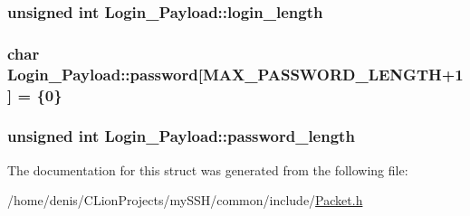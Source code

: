 \subsubsection[{\texorpdfstring{login\+\_\+length}{login_length}}]{\setlength{\rightskip}{0pt plus 5cm}unsigned int Login\+\_\+\+Payload\+::login\+\_\+length}\hypertarget{structLogin__Payload_ae20d686a1176b58a1409a551dbbe539b}{}\label{structLogin__Payload_ae20d686a1176b58a1409a551dbbe539b}
\subsubsection[{\texorpdfstring{password}{password}}]{\setlength{\rightskip}{0pt plus 5cm}char Login\+\_\+\+Payload\+::password\mbox{[}{\bf M\+A\+X\+\_\+\+P\+A\+S\+S\+W\+O\+R\+D\+\_\+\+L\+E\+N\+G\+TH}+1\mbox{]} = \{0\}}\hypertarget{structLogin__Payload_aadc289041604b574892f1cdb966c7ca5}{}\label{structLogin__Payload_aadc289041604b574892f1cdb966c7ca5}
\subsubsection[{\texorpdfstring{password\+\_\+length}{password_length}}]{\setlength{\rightskip}{0pt plus 5cm}unsigned int Login\+\_\+\+Payload\+::password\+\_\+length}\hypertarget{structLogin__Payload_a376b903185f3e8bb7dc0bd5bd55ebff9}{}\label{structLogin__Payload_a376b903185f3e8bb7dc0bd5bd55ebff9}


The documentation for this struct was generated from the following file\+:\begin{DoxyCompactItemize}
\item 
/home/denis/\+C\+Lion\+Projects/my\+S\+S\+H/common/include/\hyperlink{Packet_8h}{Packet.\+h}\end{DoxyCompactItemize}
